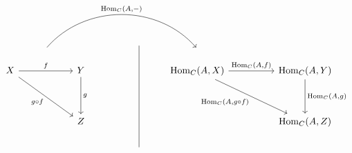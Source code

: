 \documentclass[uplatex,a4j,12pt,dvipdfmx]{jsarticle}
\begin{document}
\[
	\begin{tikzcd}
		& {} \arrow[rrrr, "{{\rm Hom}_{C}(A, -)}", bend left=49, shift right=4] &                   & {}                                       &  & {}                                                                                                      &  &                                                           \\
		X \arrow[rrdd, "g \circ f"'] \arrow[rr, "f"] &                                                                       & Y \arrow[dd, "g"] &                                          &  & {{\rm Hom}_{C}(A,X)} \arrow[rr, "{{\rm Hom}_{C}(A, f)}"] \arrow[rrdd, "{{\rm Hom}_{C}(A, g \circ f)}"'] &  & {{\rm Hom}_{C}(A, Y)} \arrow[dd, "{{\rm Hom}_{C}(A, g)}"] \\
		&                                                                       &                   &                                          &  &                                                                                                         &  &                                                           \\
		&                                                                       & Z                 &                                          &  &                                                                                                         &  & {{\rm Hom}_{C}(A, Z)}                                     \\
		&                                                                       &                   & {} \arrow[uuuu, no head, shift right=10] &  &                                                                                                         &  &
	\end{tikzcd}
\]
\end{document}

